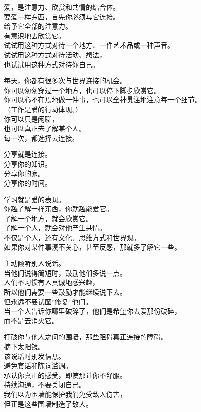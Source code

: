 \documentclass[
]{article}
\begin{document}
爱，是注意力、欣赏和共情的结合体。\\
要爱一样东西，首先你必须与它连接。\\
给予它全部的注意力。\\
有意识地去欣赏它。\\
试试用这种方式对待一个地方、一件艺术品或一种声音。\\
试试用这种方式对待活动、想法，\\
也试试用这种方式对待你自己。

每天，你都有很多次与世界连接的机会。\\
你可以匆匆穿过一个地方，也可以停下脚步欣赏它。\\
你可以心不在焉地做一件事，也可以全神贯注地注意每一个细节。\\
（工作是爱的行动体现。）\\
你可以只是闲聊，\\
也可以真正去了解某个人。\\
每一次，都选择去连接。

分享就是连接。\\
分享你的知识。\\
分享你的家。\\
分享你的时间。

学习就是爱的表现。\\
你越了解一样东西，你就越能爱它。\\
了解一个地方，就会欣赏它。\\
了解一个人，就会对他产生共情。\\
不仅是个人，还有文化、思维方式和世界观。\\
如果你对某件事漠不关心，甚至反感，那就多了解它一些。

主动倾听别人说话。\\
当他们说得简短时，鼓励他们多说一点。\\
人们不习惯有人真诚地感兴趣，\\
所以他们需要一些鼓励才能继续说下去。\\
但永远不要试图``修复''他们。\\
当一个人告诉你哪里破碎了，他们是希望你去爱那份破碎，\\
而不是去消灭它。

打破你与他人之间的围墙，那些阻碍真正连接的障碍。\\
摘下太阳镜。\\
该说话时别发信息。\\
避免套话和陈词滥调。\\
承认你真正的感受，即使那让你不舒服。\\
持续沟通，不要关闭自己。\\
我们以为围墙能保护我们免受敌人伤害，\\
但正是这些围墙制造了敌人。
\end{document}
